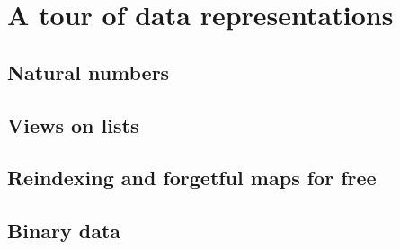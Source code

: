 \section{A tour of data representations}\label{sec:examples}

\subsection{Natural numbers}

\subsection{Views on lists}

\subsection{Reindexing and forgetful maps for free}

\subsection{Binary data}

